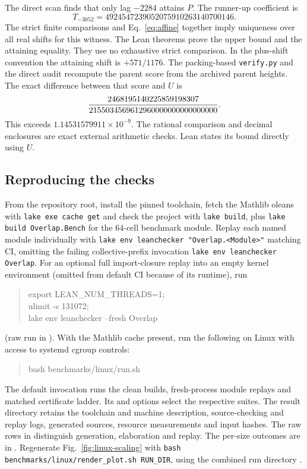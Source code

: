 \documentclass[sigplan,10pt,anonymous,review,balance=false]{acmart}
\newcommand{\leanid}[1]{\texttt{#1}}
\begin{document}
The direct scan finds that only lag $-2284$ attains $P$.
The runner-up coefficient is
\[
 T_{-3052}=4924547239052075910263140700146.
\]
The strict finite
comparisons and Eq.~\eqref{eq:affine} together imply uniqueness
over all real shifts for this witness. The Lean theorems prove
the upper bound and the attaining equality. They use no exhaustive
strict comparison. In the plus-shift convention the attaining shift
is $+571/1176$. The packing-based \leanid{verify.py} and the
direct audit recompute the parent score from the archived parent
heights. The exact difference between that score and $U$ is
\[
 \frac{2468195140225859198307}{2155034569612960000000000000000}.
\]
This exceeds $1.14531579911\times10^{-9}$. The rational
comparison and decimal enclosures are exact external arithmetic
checks. Lean states its bound directly using $U$.

\subsection{Reproducing the checks}

From the repository root, install the pinned toolchain, fetch the
Mathlib oleans with \leanid{lake exe cache get} and check the
project with \leanid{lake build}, plus \leanid{lake build Overlap.Bench}
for the 64-cell benchmark module. Replay each named module individually
with \leanid{lake env leanchecker "Overlap.<Module>"} matching CI,
omitting the failing collective-prefix invocation
\leanid{lake env leanchecker Overlap}. For an optional full
import-closure replay into an empty kernel environment (omitted from
default CI because of its runtime), run
\begin{quote}\small\ttfamily
export LEAN\_NUM\_THREADS=1;\\
ulimit -s 131072;\\
lake env leanchecker --fresh Overlap
\end{quote}
(raw run in ). With the Mathlib cache
present, run the following on Linux with access to systemd cgroup controls:
\begin{quote}\small\ttfamily
bash benchmarks/linux/run.sh
\end{quote}
The default invocation runs the clean
builds, fresh-process module replays and matched certificate
ladder. Its  and 
options select the respective suites. The result directory retains
the toolchain and machine description, source-checking and replay
logs, generated sources, resource measurements and input hashes.
The raw rows in  distinguish generation,
elaboration and replay. The per-size outcomes are in
. Regenerate Fig.~\ref{fig:linux-scaling}
with \leanid{bash benchmarks/linux/render\_plot.sh RUN\_DIR}, using
the combined run directory
.
\end{document}
